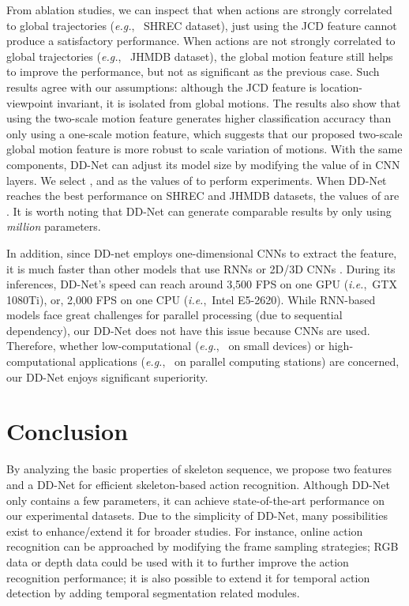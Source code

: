 \documentclass[journal]{IEEEtran}
\newcommand{\ie}{{\it i.e.}}
\newcommand{\eg}{{\it e.g.}}
\begin{document}
From ablation studies, we can inspect that when actions are strongly correlated to global trajectories (\eg,~ SHREC dataset), just using the JCD feature cannot produce a satisfactory performance. When actions are not strongly correlated to global trajectories (\eg,~ JHMDB dataset), the global motion feature still helps to improve the performance, but not as significant as the previous case. Such results agree with our assumptions: although the JCD feature is location-viewpoint invariant, it is isolated from global motions. The results also show that using the two-scale motion feature generates higher classification accuracy than only using a one-scale motion feature, which suggests that our proposed two-scale global motion feature is more robust to scale variation of motions. With the same components, DD-Net can adjust its model size by modifying the value of  in CNN layers. We select ,  and  as the values of  to perform experiments. When DD-Net reaches the best performance on SHREC and JHMDB datasets, the values of  are . It is worth noting that DD-Net can generate comparable results by only using \emph{ million} parameters.

In addition, since DD-net employs one-dimensional CNNs to extract the feature, it is much faster than other models that use RNNs \cite{wang2017modeling,zhang2018fusing,song2017end,lee2017ensemble} or 2D/3D CNNs \cite{ devineau2018convolutional,liu2018recognizing,zolfaghari2017chained,choutas2018potion, ludl2019simple}. During its inferences, DD-Net's speed can reach around 3,500 FPS on one GPU (\ie,~GTX 1080Ti), or, 2,000 FPS on one CPU (\ie,~Intel E5-2620). While RNN-based models face great challenges for parallel processing (due to sequential dependency), our DD-Net does not have this issue because CNNs are used. Therefore, whether low-computational (\eg,~ on small devices) or high-computational applications (\eg,~ on parallel computing stations) are concerned, our DD-Net enjoys significant superiority.



\section{Conclusion}
By analyzing the basic properties of skeleton sequence, we propose two features and a DD-Net for efficient skeleton-based action recognition. Although DD-Net only contains a few parameters, it can achieve state-of-the-art performance on our experimental datasets. Due to the simplicity of DD-Net, many possibilities exist to enhance/extend it for broader studies. For instance, online action recognition can be approached by modifying the frame sampling strategies; RGB data or depth data could be used with it to further improve the action recognition performance; it is also possible to extend it for temporal action detection by adding temporal segmentation related modules. 
\end{document}
